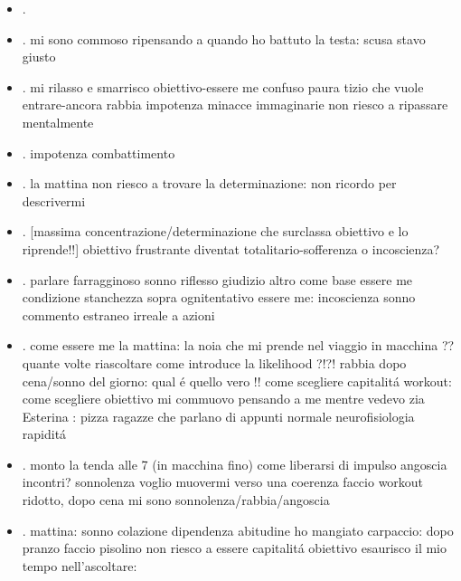 \begin{itemize}
\item {}.

\item {}.
mi sono commoso ripensando a quando ho battuto la testa: scusa stavo giusto

\item {}.
mi rilasso e smarrisco obiettivo-essere me confuso
paura tizio che vuole entrare-ancora rabbia impotenza minacce immaginarie
non riesco a ripassare mentalmente

\item {}.
impotenza combattimento
\item {}.
la mattina non riesco a trovare la determinazione: non ricordo per descrivermi

\item {}.
[massima concentrazione/determinazione che surclassa obiettivo e lo riprende!!]
obiettivo frustrante diventat totalitario-sofferenza o incoscienza?

\item {}.
parlare farragginoso
sonno
riflesso giudizio altro come base essere me
condizione stanchezza sopra ognitentativo essere me: incoscienza sonno
commento estraneo irreale a azioni

\item {}.
come essere me la mattina: la noia che mi prende nel viaggio in macchina ?? quante volte riascoltare come introduce la likelihood ?!?!
rabbia dopo cena/sonno del giorno: qual \'e quello vero !! come scegliere capitalit\'a workout: come scegliere obiettivo
mi commuovo pensando a me mentre vedevo zia Esterina
: pizza ragazze che parlano di appunti normale neurofisiologia rapidit\'a

\item {}.
monto la tenda alle 7 (in macchina fino)
come liberarsi di impulso angoscia incontri?
sonnolenza
voglio muovermi verso una coerenza
faccio workout ridotto, dopo cena mi sono sonnolenza/rabbia/angoscia

\item {}.
mattina: sonno colazione dipendenza abitudine
ho mangiato carpaccio: dopo pranzo faccio pisolino
non riesco a essere capitalit\'a obiettivo
esaurisco il mio tempo nell'ascoltare: 


\end{itemize}
